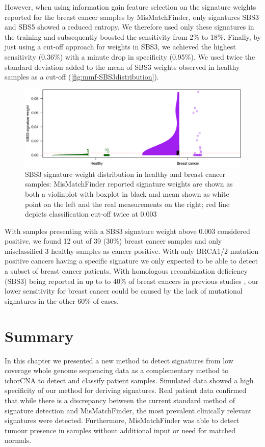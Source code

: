 However, when using information gain feature selection on the signature weights reported for the breast cancer samples by MisMatchFinder, only signatures SBS3 and SBS5 showed a reduced entropy. We therefore used only these signatures in the training and subsequently boosted the sensitivity from 2\% to 18\%. Finally, by just using a cut-off approach for weights in SBS3, we achieved the highest sensitivity (0.36\%) with a minute drop in specificity (0.95\%). We used twice the standard deviation added to the mean of SBS3 weights observed in healthy samples as a cut-off (\autoref{fig:mmf-SBS3distribution}).

\begin{figure}[ht]
\centering
\includegraphics[width=.99\linewidth]{Figures/MisMatchFinder/SBS3Distributions.pdf}
\caption[SBS3 signature weight distribution in healthy and breast cancer samples]{SBS3 signature weight distribution in healthy and breast cancer samples: MisMatchFinder reported signature weights are shown as both a violinplot with boxplot in black and mean shown as white point on the left and the real measurements on the right; red line depicts classification cut-off twice at 0.003}\label{fig:mmf-SBS3distribution}
\end{figure}

With samples presenting with a SBS3 signature weight above 0.003 considered positive, we found 12 out of 39 (30\%) breast cancer samples and only misclassified 3 healthy samples as cancer positive. With only BRCA1/2 mutation positive cancers having a specific signature we only expected to be able to detect a subset of breast cancer patients. With homologous recombination deficiency (SBS3) being reported in up to to 40\% of breast cancers in previous studies \cite{AkashiTanaka2015}, our lower sensitivity for breast cancer could be caused by the lack of mutational signatures in the other 60\% of cases.

\section{Summary}
In this chapter we presented a new method to detect signatures from low coverage whole genome sequencing data as a complementary method to ichorCNA to detect and classify patient samples. Simulated data showed a high specificity of our method for deriving signatures. Real patient data confirmed that while there is a discrepancy between the current standard method of signature detection and MisMatchFinder, the most prevalent clinically relevant signatures were detected. Furthermore, MisMatchFinder was able to detect tumour presence in samples without additional input or need for matched normals.

